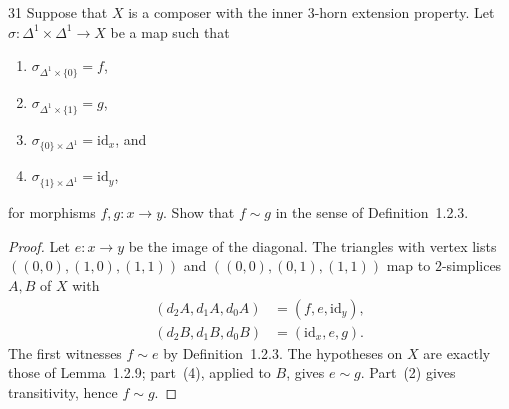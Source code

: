 \begin{exercise}{31}
Suppose that $X$ is a composer with the inner $3$-horn extension property. Let
$\sigma\colon\Delta^1\times\Delta^1\to X$ be a map such that
\begin{enumerate}[label=(\arabic*),leftmargin=*,itemsep=0pt,parsep=0pt,
                  topsep=.5\baselineskip]
 \item $\sigma_{\Delta^1\times\{0\}}=f$,
 \item $\sigma_{\Delta^1\times\{1\}}=g$,
 \item $\sigma_{\{0\}\times\Delta^1}=\mathrm{id}_x$, and
 \item $\sigma_{\{1\}\times\Delta^1}=\mathrm{id}_y$,
\end{enumerate}
for morphisms $f,g\colon x\to y$. Show that $f\sim g$ in the sense of
Definition~1.2.3.

\begin{proof}
Let $e\colon x\to y$ be the image of the diagonal.
The triangles with vertex lists
$((0,0),(1,0),(1,1))$ and $((0,0),(0,1),(1,1))$
map to $2$-simplices $A,B$ of $X$ with
\[
 \begin{aligned}
  (d_2A,d_1A,d_0A)&=(f,e,\mathrm{id}_y),\\
  (d_2B,d_1B,d_0B)&=(\mathrm{id}_x,e,g).
 \end{aligned}
\]
The first witnesses $f\sim e$ by Definition~1.2.3.
The hypotheses on $X$ are exactly those of Lemma~1.2.9;
part~(4), applied to $B$, gives $e\sim g$.
Part~(2) gives transitivity, hence $f\sim g$.
\end{proof}
\end{exercise}
